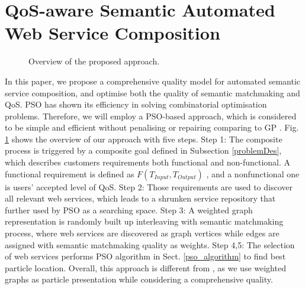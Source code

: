 \documentclass{llncs}
\begin{document}
\section{QoS-aware Semantic Automated Web Service Composition}\label{qswsc_approach}
\begin{figure}[h]
\centerline{
}
 \caption{Overview of the proposed approach.}
 \label{overview}
\end{figure}
In this paper, we propose a comprehensive quality model for automated semantic service composition, and optimise both the quality of semantic matchmaking and QoS. PSO has shown its efficiency in solving combinatorial optimisation problems. Therefore, we will employ a PSO-based approach, which is considered to be simple and efficient without penalising or repairing comparing to GP \cite{da2014graph}. Fig. \ref{overview} shows the overview of our approach with five steps. Step 1: The composite process is triggered by a composite goal defined in Subsection \ref{problemDes}, which describes customers requirements both functional and non-functional. A functional requirement is defined as $F(T_{Input}, T_{Output})$ , and a nonfunctional one is users' accepted level of QoS. Step 2: Those requirements are used to discover all relevant web services, which leads to a shrunken service repository that further used by PSO as a searching space. Step 3: A weighted graph representation is randomly built up interleaving with semantic matchmaking process, where web services are discovered as graph vertices while edges are assigned with semantic matchmaking quality as weights. Step 4,5: The selection of web services performs PSO algorithm in Sect. \ref{pso_algorithm} to find best particle location. Overall, this approach is different from \cite{da2016particle}, as we use weighted graphs as particle presentation while considering a comprehensive quality.
\end{document}
